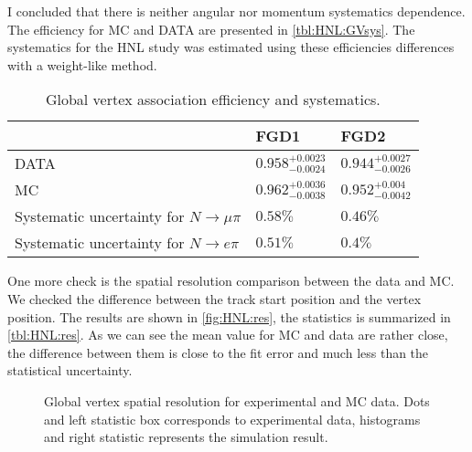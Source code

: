 \documentclass[../main.tex]{subfiles}
\begin{document}
I concluded that there is neither angular nor momentum systematics dependence. The efficiency for MC and DATA are presented in \autoref{tbl:HNL:GVsys}. The systematics for the HNL study was estimated using these efficiencies differences with a weight-like method.
\begin{table}[!ht]
\begin{center}
\begin{tabular}{|l|l|l|}
    \hline
    & FGD1 & FGD2 \\
    \hline
    DATA   & $0.958^{+0.0023}_{-0.0024}$ & $0.944^{+0.0027}_{-0.0026}$  \\
    \hline
    MC      & $0.962^{+0.0036}_{-0.0038}$ & $0.952^{+0.004}_{-0.0042}$  \\
    \hline
    Systematic uncertainty for $N\to\mu\pi$ & $0.58\%$ & $0.46\%$ \\
    \hline
    Systematic uncertainty for $N\to e\pi$ & $0.51\%$ & $0.4\%$ \\
    \hline

\end{tabular}
\caption{Global vertex association efficiency and systematics.}
\label{tbl:HNL:GVsys}
\end{center}
\end{table}
One more check is the spatial resolution comparison between the data and MC. We checked the difference between the track start position and the vertex position. The results are shown in \autoref{fig:HNL:res}, the statistics is summarized in \autoref{tbl:HNL:res}. As we can see the mean value for MC and data are rather close, the difference between them is close to the fit error and much less than the statistical uncertainty.
\begin{figure}[!ht]
\begin{center}
    \begin{minipage}{0.49\linewidth}
    \end{minipage}
    \hfill
    \begin{minipage}{0.49\linewidth}
    \end{minipage}
    \vfill
    \begin{minipage}{0.49\linewidth}
    \end{minipage}
    \caption{Global vertex spatial resolution for experimental and MC data. Dots and left statistic box corresponds to experimental data, histograms and right statistic represents the simulation result.}
    \label{fig:HNL:res}
\end{center}
\end{figure}
\end{document}

